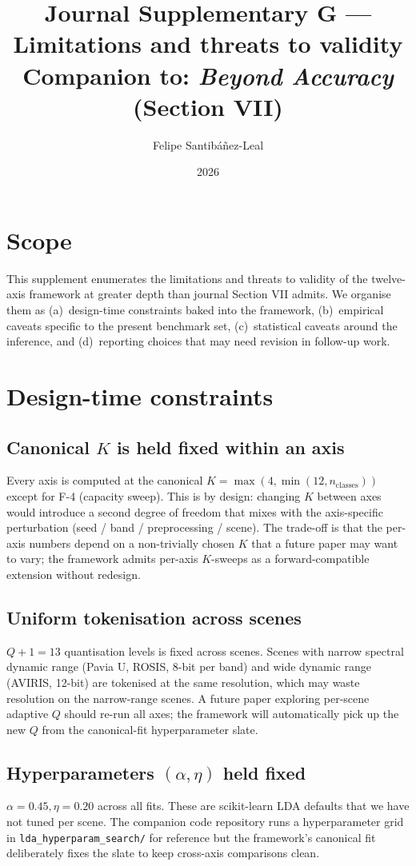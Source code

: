 \documentclass[11pt,a4paper]{article}
\title{Journal Supplementary G --- Limitations and threats to validity\\
{\large Companion to: \emph{Beyond Accuracy} (Section VII)}}
\author{Felipe Santib\'a\~nez-Leal}
\date{2026}
\begin{document}
\maketitle

\section{Scope}
This supplement enumerates the limitations and threats to validity
of the twelve-axis framework at greater depth than journal Section
VII admits. We organise them as (a)~design-time constraints baked
into the framework, (b)~empirical caveats specific to the present
benchmark set, (c)~statistical caveats around the inference, and
(d)~reporting choices that may need revision in follow-up work.

\section{Design-time constraints}

\subsection{Canonical $K$ is held fixed within an axis}
Every axis is computed at the canonical $K = \max(4, \min(12,
n_{\text{classes}}))$ except for F-4 (capacity sweep). This is by
design: changing $K$ between axes would introduce a second degree of
freedom that mixes with the axis-specific perturbation
(seed / band / preprocessing / scene). The trade-off is that the
per-axis numbers depend on a non-trivially chosen $K$ that a future
paper may want to vary; the framework admits per-axis $K$-sweeps as
a forward-compatible extension without redesign.

\subsection{Uniform tokenisation across scenes}
$Q + 1 = 13$ quantisation levels is fixed across scenes. Scenes with
narrow spectral dynamic range (Pavia U, ROSIS, 8-bit per band) and
wide dynamic range (AVIRIS, 12-bit) are tokenised at the same
resolution, which may waste resolution on the narrow-range scenes.
A future paper exploring per-scene adaptive $Q$ should re-run all
axes; the framework will automatically pick up the new $Q$ from the
canonical-fit hyperparameter slate.

\subsection{Hyperparameters $(\alpha, \eta)$ held fixed}
$\alpha = 0.45, \eta = 0.20$ across all fits. These are scikit-learn
LDA defaults that we have not tuned per scene. The companion code
repository runs a hyperparameter grid in
\texttt{lda\_hyperparam\_search/} for reference but the framework's
canonical fit deliberately fixes the slate to keep cross-axis
comparisons clean.
\end{document}
